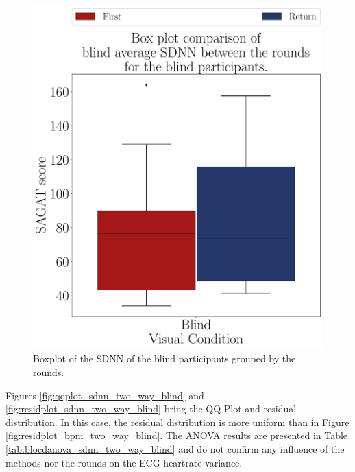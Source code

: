 \begin{figure}[!htb]
\begin{minipage}{0.45\textwidth}
        \includegraphics[width = \textwidth]{Resultados/ECG/Figuras/pdf/boxplot_ecg_sdnn_blind_rounds.pdf}
        \caption{Boxplot of the SDNN of the blind participants grouped by the rounds.}
        \label{fig:boxplot_ecg_sdnn_blind_rounds}
    \end{minipage}
\end{figure}


Figures \ref{fig:qqplot_sdnn_two_way_blind} and \ref{fig:residplot_sdnn_two_way_blind} bring the QQ Plot and residual distribution. In this case, the residual distribution is more uniform than in Figure \ref{fig:residplot_bpm_two_way_blind}. The ANOVA results are presented in Table \ref{tab:blocdanova_sdnn_two_way_blind} and do not confirm any influence of the methods nor the rounds on the ECG heartrate variance.

